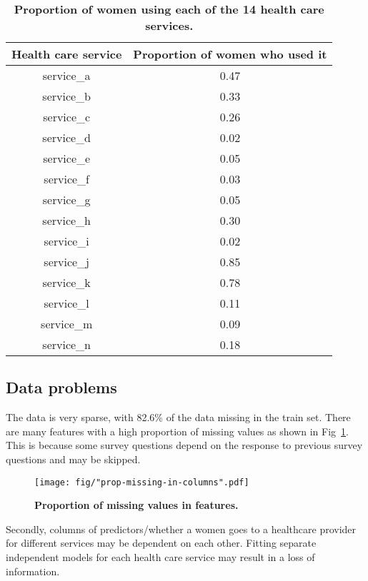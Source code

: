 \documentclass{article}\usepackage[]{graphicx}\usepackage[]{color}
\begin{document}
\begin{table}[ht]
  \centering
  \begin{tabular}{@{}|c|c|@{}}
  \hline
  Health care service & Proportion of women who used it \\ 
  \hline
  service\_a & 0.47 \\ 
  service\_b & 0.33 \\ 
  service\_c & 0.26 \\ 
  service\_d & 0.02 \\ 
  service\_e & 0.05 \\ 
  service\_f & 0.03 \\ 
  service\_g & 0.05 \\ 
  service\_h & 0.30 \\ 
  service\_i & 0.02 \\ 
  service\_j & 0.85 \\ 
  service\_k & 0.78 \\ 
  service\_l & 0.11 \\ 
  service\_m & 0.09 \\ 
  service\_n & 0.18 \\ 
  \hline
  \end{tabular}
	\caption{\textbf{Proportion of women using each of the 14 health care services.}} 
  \label{tab-prop-svc}
\end{table}

\subsection{Data problems}
The data is very sparse, with 82.6\% of the data missing in the train set. There are many features with a high proportion of missing values as shown in Fig~\ref{fig-missing}. This is because some survey questions depend on the response to previous survey questions and may be skipped.

\begin{figure}[htbp]
    \begin{center}
		\texttt{[image: fig/"prop-missing-in-columns".pdf]}
		\caption{\textbf{Proportion of missing values in features.}}
		\label{fig-missing}
  \end{center}
\end{figure}

Secondly, columns of predictors/whether a women goes to a healthcare provider for different services may be dependent on each other. Fitting separate independent models for each health care service may result in a loss of information.
\end{document}
